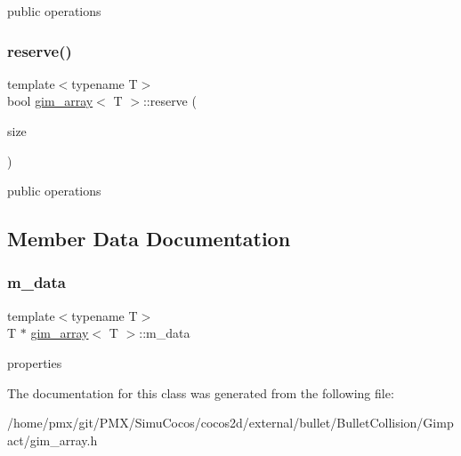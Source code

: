 public operations \mbox{\label{classgim__array_a572f94b5b67d505335150a2dea8a7e3d}} 
\subsubsection{\texorpdfstring{reserve()}{reserve()}\hspace{0.1cm}{\footnotesize\ttfamily [2/2]}}
{\footnotesize\ttfamily template$<$typename T$>$ \\
bool \hyperlink{classgim__array}{gim\+\_\+array}$<$ T $>$\+::reserve (\begin{DoxyParamCaption}\item[{G\+U\+I\+NT}]{size }\end{DoxyParamCaption})\hspace{0.3cm}{\ttfamily [inline]}}

public operations 

\subsection{Member Data Documentation}
\mbox{\label{classgim__array_a0ac4ef950a94175dd3b5013c2a4a11a3}} 
\subsubsection{\texorpdfstring{m\+\_\+data}{m\_data}}
{\footnotesize\ttfamily template$<$typename T$>$ \\
T $\ast$ \hyperlink{classgim__array}{gim\+\_\+array}$<$ T $>$\+::m\+\_\+data}

properties 

The documentation for this class was generated from the following file\+:\begin{DoxyCompactItemize}
\item 
/home/pmx/git/\+P\+M\+X/\+Simu\+Cocos/cocos2d/external/bullet/\+Bullet\+Collision/\+Gimpact/gim\+\_\+array.\+h\end{DoxyCompactItemize}
